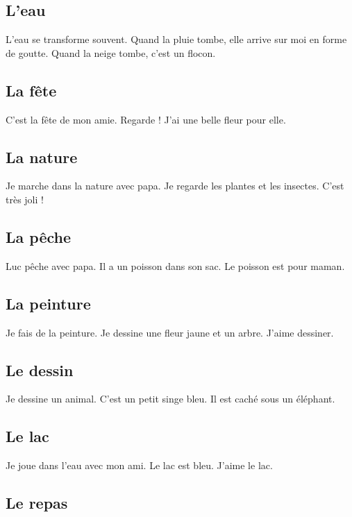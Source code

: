 \documentclass[11pt, french]{article}
\begin{document}
\subsection{L'eau}

L'eau se transforme souvent. Quand la pluie tombe, elle arrive sur moi en forme de goutte.
Quand la neige tombe, c'est un flocon.

\subsection{La fête}

C'est la fête de mon amie. Regarde ! J'ai une belle fleur pour elle.

\subsection{La nature}

Je marche dans la nature avec papa. Je regarde les plantes et les insectes. C'est très joli !

\subsection{La pêche}

Luc pêche avec papa. Il a un poisson dans son sac. Le poisson est pour maman.

\subsection{La peinture}

Je fais de la peinture. Je dessine une fleur jaune et un arbre. J'aime dessiner.

\subsection{Le dessin}

Je dessine un animal. C'est un petit singe bleu. Il est caché sous un éléphant.

\subsection{Le lac}

Je joue dans l'eau avec mon ami. Le lac est bleu. J'aime le lac.

\subsection{Le repas}
\end{document}
